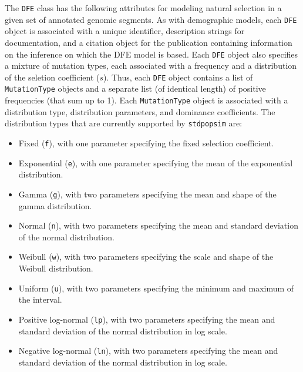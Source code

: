 \documentclass[hidelinks]{article}
\newcommand{\stdpopsim}{\texttt{stdpopsim}\xspace}
\begin{document}
    The \texttt{DFE} class 
    has the following attributes for modeling natural selection in a given set of annotated genomic segments.
    As with demographic models, each \texttt{DFE} object is associated with a unique identifier, description strings for documentation,
    and a citation object for the publication containing information on the inference on which the DFE model is based.
    Each \texttt{DFE} object also specifies a mixture of mutation types,
    each associated with a frequency and a distribution of the seletion coefficient ($s$).
    Thus, each \texttt{DFE} object contains a list of \texttt{MutationType} objects
    and a separate list (of identical length) of positive frequencies (that sum up to 1).
    Each \texttt{MutationType} object is associated with a distribution type, distribution parameters, and dominance coefficients.
    The distribution types that are currently supported by \stdpopsim are:
    \begin{itemize}
       \item Fixed       (\texttt{f}), with one parameter specifying the fixed selection coefficient.
       \item Exponential (\texttt{e}), with one parameter specifying the mean of the exponential distribution.
       \item Gamma       (\texttt{g}), with two parameters specifying the mean and shape of the gamma distribution.
       \item Normal      (\texttt{n}), with two parameters specifying the mean and standard deviation of the normal distribution.
       \item Weibull     (\texttt{w}), with two parameters specifying the scale and shape of the Weibull distribution.
       \item Uniform     (\texttt{u}), with two parameters specifying the minimum and maximum of the interval.
       \item Positive log-normal  (\texttt{lp}), with two parameters specifying the mean and standard deviation of the normal distribution in log scale.
       \item Negative log-normal  (\texttt{ln}), with two parameters specifying the mean and standard deviation of the normal distribution in log scale.
    \end{itemize}
    
\end{document}
